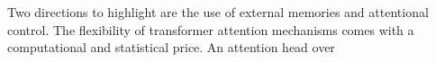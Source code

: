 Two directions to highlight are the use of external memories and attentional control. The flexibility of transformer attention mechanisms comes with a computational and statistical price. An attention head over 
%
